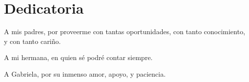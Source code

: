 \section*{Dedicatoria}

A mis padres, por proveerme con tantas oportunidades, con tanto conocimiento, y con tanto cariño. 

\vspace{0.2cm}

A mi hermana, en quien sé podré contar siempre. 

\vspace{0.2cm}

A Gabriela, por su inmenso amor, apoyo, y paciencia.